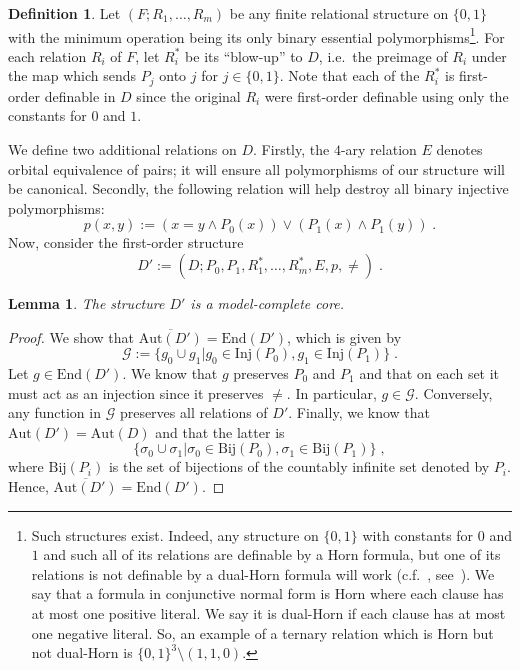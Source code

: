 \documentclass{article}
\newtheorem{lemma}[theorem]{Lemma}
\theoremstyle{remark}
\theoremstyle{definition}
\newtheorem{definition}[theorem]{Definition}
\begin{document}
\begin{definition}\label{def:defD} Let $(F; R_1, \dots, R_m)$ be any finite relational structure on $\{0,1\}$ with the minimum operation being its only binary essential polymorphisms\footnote{Such structures exist. Indeed, any structure on $\{0,1\}$ with constants for $0$ and $1$ and such all of its relations are definable by a Horn formula, but one of its relations is not definable by a dual-Horn formula will work (c.f.~\cite{schaefer1978complexity}, see~\cite[Theorem 6.2.7]{BodCSP}). We say that a formula in conjunctive normal form is Horn where each clause has at most one positive literal. We say it is dual-Horn if each clause has at most one negative literal. So, an example of a ternary relation which is Horn but not dual-Horn is $\{0,1\}^3\setminus(1,1,0)$.}. For each relation $R_i$ of $F$, %
let $R_i^*$ be its ``blow-up'' to $D$, i.e.~the preimage of $R_i$ under the map which sends $P_j$ onto $j$ for $j\in\{0,1\}$. %
Note that each of the $R_i^*$ is first-order definable in $D$ since the original $R_i$ were first-order definable %
using only the constants for $0$ and $1$.

We define two additional relations on $D$. Firstly, the $4$-ary relation $E$ denotes orbital equivalence of pairs; it will ensure all polymorphisms of our structure will be canonical. Secondly, the following relation will help destroy all binary injective polymorphisms:
\[ p(x,y) := (x=y\wedge P_0(x))\vee(P_1(x)\wedge P_1(y))\; .\]
Now, consider the first-order structure
\[D':=(D; P_0, P_1, R^*_1, \dots, R^*_m, E, p, \neq)\;.\]
\end{definition}

\begin{lemma}\label{lem:Datacore} The structure $D'$ is a model-complete core. 
\end{lemma}
\begin{proof} We show that $\overline{\mathrm{Aut}(D')}=\mathrm{End}(D')$, which is given by 
\[\mathcal{G}:=\{g_0\cup g_1\vert g_0\in \mathrm{Inj}(P_0), g_1\in\mathrm{Inj}(P_1)\} \;.\]
Let $g\in\mathrm{End}(D')$. We know that $g$ preserves $P_0$ and $P_1$ and that on each set it must act as an injection since it preserves $\neq$. In particular, $g\in\mathcal{G}$. Conversely, any function in $\mathcal{G}$ preserves all relations of $D'$. Finally, we know that $\mathrm{Aut}(D')=\mathrm{Aut}(D)$ and that the latter is
\[\{\sigma_0\cup \sigma_1\vert \sigma_0\in\mathrm{Bij}(P_0), \sigma_1\in\mathrm{Bij}(P_1)\}\; ,\]
where $\mathrm{Bij}(P_i)$ is the set of bijections of the countably infinite set denoted by $P_i$.
Hence, $\overline{\mathrm{Aut}(D')}=\mathrm{End}(D')$.
\end{proof}
\end{document}
